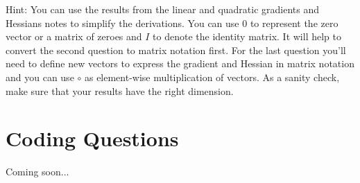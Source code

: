\documentclass{article}
\begin{document}
Hint: You can use the results from the linear and quadratic gradients and Hessians notes to simplify the derivations. You can use $0$ to represent the zero vector or a matrix of zeroes and $I$ to denote the identity matrix. It will help to convert the second question to matrix notation first. For the last question you'll need to define new vectors to express the gradient and Hessian in matrix notation and you can use $\circ$ as element-wise multiplication of vectors. As a sanity check, make sure that your results have the right dimension.




\section{Coding Questions}

Coming soon...

 
\end{document}
